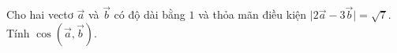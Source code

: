 \begin{bt}
	Cho hai vectơ $ \overrightarrow{a} $ và $ \overrightarrow{b} $ có độ dài bằng $ 1 $ và thỏa mãn điều kiện $ \big | 2\overrightarrow{a}-3\overrightarrow{b} \big |=\sqrt{7} $. Tính $ \cos \left (\overrightarrow{a},\overrightarrow{b}\right ) $.%
\end{bt}

